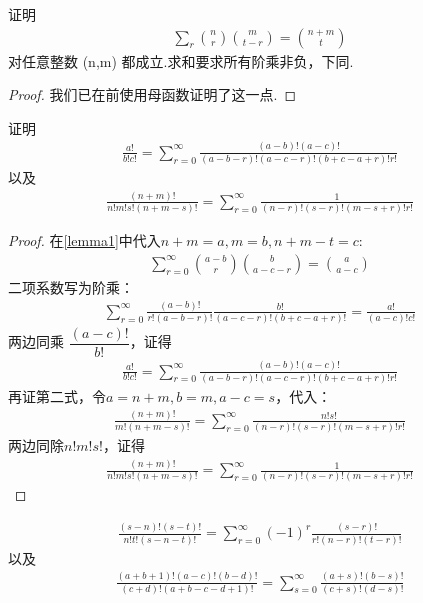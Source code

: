 \begin{lemma}
证明
\begin{align}\label{lemma1}
    \sum_{r} \binom{n}{r}\binom{m}{t-r}=\binom{n+m}{t}
\end{align}
对任意整数 (n,m) 都成立.求和要求所有阶乘非负，下同.
\end{lemma}
\begin{proof}
    我们已在前使用母函数证明了这一点.
\end{proof}
\begin{lemma}
证明
    \begin{align}\label{lemma2_1}
        \frac{a!}{b!c!}=\sum_{r=0}^\infty\frac{(a-b)!(a-c)!}{(a-b-r)!(a-c-r)!(b+c-a+r)!r!}
    \end{align}
以及
\begin{align}\label{lemma2_2}
   \frac{(n+m)!}{n!m!s!(n+m-s)!}=\sum_{r=0}^\infty\frac{1}{(n-r)!(s-r)!(m-s+r)!r!}
\end{align}
\end{lemma}
\begin{proof}
在\ref{lemma1}中代入$n+m=a,m=b,n+m-t=c$:
\begin{align*}
    \sum_{r=0}^\infty \binom{a-b}{r}\binom{b}{a-c-r}=\binom{a}{a-c}
\end{align*}
二项系数写为阶乘：
\begin{align*}
    \sum_{r=0}^\infty \frac{(a-b)!}{r!(a-b-r)!} \frac{b!}{(a-c-r)!(b+c-a+r)!}=\frac{a!}{(a-c)!c!}
\end{align*}
两边同乘 $\dfrac{(a-c)!}{b!}$，证得
\begin{align*}
     \frac{a!}{b!c!}=\sum_{r=0}^\infty\frac{(a-b)!(a-c)!}{(a-b-r)!(a-c-r)!(b+c-a+r)!r!}
\end{align*}
再证第二式，令$a = n + m, b=m,a-c=s$，代入：
\begin{align*}
    \frac{(n+m)!}{m!(n+m-s)!}=\sum_{r=0}^\infty
\frac{n!s!}{(n-r)!(s-r)!(m-s+r)!r!}
\end{align*}
两边同除$n!m!s!$，证得
\begin{align*}
    \frac{(n+m)!}{n!m!s!(n+m-s)!}=\sum_{r=0}^\infty\frac{1}{(n-r)!(s-r)!(m-s+r)!r!}
\end{align*}
\end{proof}
\begin{lemma}
    \begin{align}\label{lemma3_1}
        \frac{(s-n)!(s-t)!}{n!t!(s-n-t)!}=\sum_{r=0}^\infty(-1)^r\frac{(s-r)!}{r!(n-r)!(t-r)!}
    \end{align}
    以及
    \begin{align}\label{lemma3_2}
        \frac{(a+b+1)!(a-c)!(b-d)!}{(c+d)!(a+b-c-d+1)!}=\sum_{s=0}^\infty\frac{(a+s)!(b-s)!}{(c+s)!(d-s)!}
    \end{align}
\end{lemma}
